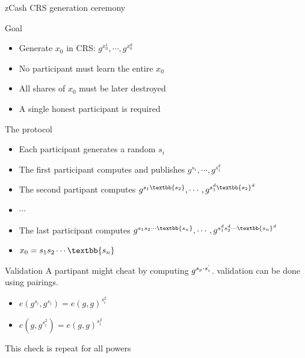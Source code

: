 \documentclass[handout]{beamer}
\begin{document}
\begin{frame}[allowframebreaks]{zCash CRS generation ceremony}
    \begin{block}{Goal}
        \begin{itemize}
            \item Generate $x_0$ in CRS: $g^{x_0^1}, \cdots, g^{x_0^d}$
            \item No participant must learn the entire $x_0$
            \item All shares of $x_0$ must be later destroyed
            \item A single honest participant is required
        \end{itemize}
    \end{block}
    \framebreak
    \begin{block}{The protocol}
        \begin{itemize}
            \item Each participant generates a random $s_i$
            \item The first participant computes and publishes $g^{s_1}, \cdots, g^{s_1^d}$  
            \item The second partipant computes $g^{s_1 \textbb{s_2}}, \cdots, g^{s_1^d \textbb{s_2}^d}$
            \item $\cdots$
            \item The last participant computes $g^{s_1 s_2 \cdots \textbb{s_n}}, \cdots, g^{s_1^d s_2^d \cdots \textbb{s_n}^d}$
            \item $x_0 = s_1 s_2 \cdots \textbb{s_n}$
        \end{itemize} 
    \end{block}
    \framebreak
    \begin{block}{Validation}
         A partipant might cheat by computing $g^{s_p \cdot s_i^`}$. validation can be done using pairings.
         \begin{itemize}
            \item $e(g^{s_i},g^{s_i})=e(g,g)^{s_i^2}$
            \item $e(g,g^{s_i^2})=e(g,g)^{s_i^2}$
         \end{itemize}
         This check is repeat for all powers
    \end{block}
\end{frame}
\end{document}
